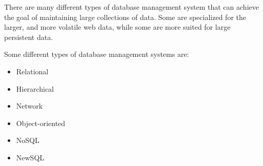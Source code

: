 \documentclass[letterpaper, 12pt]{article}
\begin{document}
There are many different types of database management system that can achieve the
goal of maintaining large collections of data. Some are specialized for the larger, and 
more volatile web data, while some are more suited for large persistent data.  
\par\vspace{\baselineskip}
Some different types of database management systems are:
\begin{itemize}
\item Relational
\item Hierarchical
\item Network
\item Object-oriented
\item NoSQL
\item NewSQL
\end{itemize}
\end{document}
